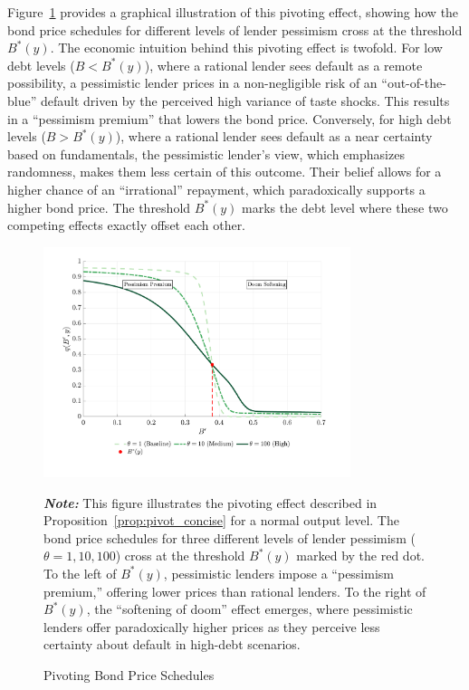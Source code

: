 \documentclass[12pt]{article}
\theoremstyle{plain}
\begin{document}
Figure~\ref{fig:pivoting_proof} provides a graphical illustration of this
pivoting effect, showing how the bond price schedules for different levels of
lender pessimism cross at the threshold $B^*(y)$. The economic intuition behind
this pivoting effect is twofold. For low debt levels ($B<B^*(y)$), where a
rational lender sees default as a remote possibility, a pessimistic lender
prices in a non-negligible risk of an ``out-of-the-blue'' default driven by the
perceived high variance of taste shocks. This results in a ``pessimism
premium'' that lowers the bond price. Conversely, for high debt levels
($B>B^*(y)$), where a rational lender sees default as a near certainty based on
fundamentals, the pessimistic lender's view, which emphasizes randomness, makes
them less certain of this outcome. Their belief allows for a higher chance of
an ``irrational'' repayment, which paradoxically supports a higher bond price.
The threshold $B^*(y)$ marks the debt level where these two competing effects
exactly offset each other.

\begin{figure}[htb]
	\centering
	\includegraphics[width=0.8\textwidth]{../../pessimism-default-model/results/comparison_figure_5.pdf}
	\caption{Pivoting Bond Price Schedules}\label{fig:pivoting_proof}

	\parbox{\textwidth}{\small\textit{\textbf{Note:} }This figure illustrates the pivoting effect described in Proposition~\ref{prop:pivot_concise} for a normal output level. The bond price schedules for three different levels of lender pessimism ($\theta = 1, 10, 100$) cross at the threshold $B^*(y)$ marked by the red dot. To the left of $B^*(y)$, pessimistic lenders impose a ``pessimism premium,'' offering lower prices than rational lenders. To the right of $B^*(y)$, the ``softening of doom'' effect emerges, where pessimistic lenders offer paradoxically higher prices as they perceive less certainty about default in high-debt scenarios.}
\end{figure}
\end{document}

